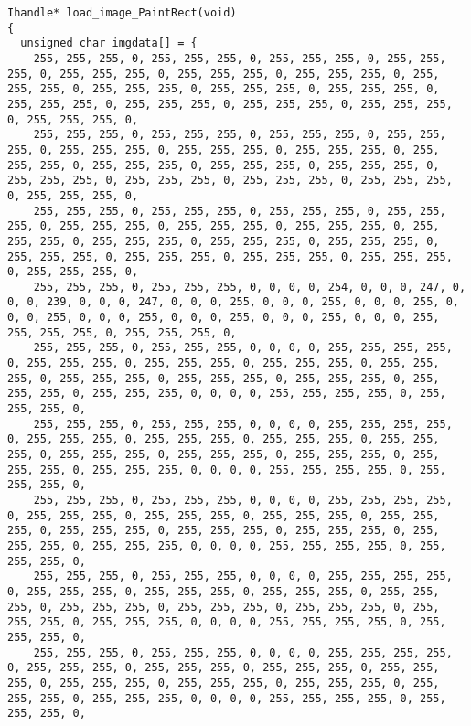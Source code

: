 \documentclass{ctexart}
\begin{document}
\begin{lstlisting}
Ihandle* load_image_PaintRect(void)
{
  unsigned char imgdata[] = {
    255, 255, 255, 0, 255, 255, 255, 0, 255, 255, 255, 0, 255, 255, 255, 0, 255, 255, 255, 0, 255, 255, 255, 0, 255, 255, 255, 0, 255, 255, 255, 0, 255, 255, 255, 0, 255, 255, 255, 0, 255, 255, 255, 0, 255, 255, 255, 0, 255, 255, 255, 0, 255, 255, 255, 0, 255, 255, 255, 0, 255, 255, 255, 0,
    255, 255, 255, 0, 255, 255, 255, 0, 255, 255, 255, 0, 255, 255, 255, 0, 255, 255, 255, 0, 255, 255, 255, 0, 255, 255, 255, 0, 255, 255, 255, 0, 255, 255, 255, 0, 255, 255, 255, 0, 255, 255, 255, 0, 255, 255, 255, 0, 255, 255, 255, 0, 255, 255, 255, 0, 255, 255, 255, 0, 255, 255, 255, 0,
    255, 255, 255, 0, 255, 255, 255, 0, 255, 255, 255, 0, 255, 255, 255, 0, 255, 255, 255, 0, 255, 255, 255, 0, 255, 255, 255, 0, 255, 255, 255, 0, 255, 255, 255, 0, 255, 255, 255, 0, 255, 255, 255, 0, 255, 255, 255, 0, 255, 255, 255, 0, 255, 255, 255, 0, 255, 255, 255, 0, 255, 255, 255, 0,
    255, 255, 255, 0, 255, 255, 255, 0, 0, 0, 0, 254, 0, 0, 0, 247, 0, 0, 0, 239, 0, 0, 0, 247, 0, 0, 0, 255, 0, 0, 0, 255, 0, 0, 0, 255, 0, 0, 0, 255, 0, 0, 0, 255, 0, 0, 0, 255, 0, 0, 0, 255, 0, 0, 0, 255, 255, 255, 255, 0, 255, 255, 255, 0,
    255, 255, 255, 0, 255, 255, 255, 0, 0, 0, 0, 255, 255, 255, 255, 0, 255, 255, 255, 0, 255, 255, 255, 0, 255, 255, 255, 0, 255, 255, 255, 0, 255, 255, 255, 0, 255, 255, 255, 0, 255, 255, 255, 0, 255, 255, 255, 0, 255, 255, 255, 0, 0, 0, 0, 255, 255, 255, 255, 0, 255, 255, 255, 0,
    255, 255, 255, 0, 255, 255, 255, 0, 0, 0, 0, 255, 255, 255, 255, 0, 255, 255, 255, 0, 255, 255, 255, 0, 255, 255, 255, 0, 255, 255, 255, 0, 255, 255, 255, 0, 255, 255, 255, 0, 255, 255, 255, 0, 255, 255, 255, 0, 255, 255, 255, 0, 0, 0, 0, 255, 255, 255, 255, 0, 255, 255, 255, 0,
    255, 255, 255, 0, 255, 255, 255, 0, 0, 0, 0, 255, 255, 255, 255, 0, 255, 255, 255, 0, 255, 255, 255, 0, 255, 255, 255, 0, 255, 255, 255, 0, 255, 255, 255, 0, 255, 255, 255, 0, 255, 255, 255, 0, 255, 255, 255, 0, 255, 255, 255, 0, 0, 0, 0, 255, 255, 255, 255, 0, 255, 255, 255, 0,
    255, 255, 255, 0, 255, 255, 255, 0, 0, 0, 0, 255, 255, 255, 255, 0, 255, 255, 255, 0, 255, 255, 255, 0, 255, 255, 255, 0, 255, 255, 255, 0, 255, 255, 255, 0, 255, 255, 255, 0, 255, 255, 255, 0, 255, 255, 255, 0, 255, 255, 255, 0, 0, 0, 0, 255, 255, 255, 255, 0, 255, 255, 255, 0,
    255, 255, 255, 0, 255, 255, 255, 0, 0, 0, 0, 255, 255, 255, 255, 0, 255, 255, 255, 0, 255, 255, 255, 0, 255, 255, 255, 0, 255, 255, 255, 0, 255, 255, 255, 0, 255, 255, 255, 0, 255, 255, 255, 0, 255, 255, 255, 0, 255, 255, 255, 0, 0, 0, 0, 255, 255, 255, 255, 0, 255, 255, 255, 0,

\end{lstlisting}
\end{document}
